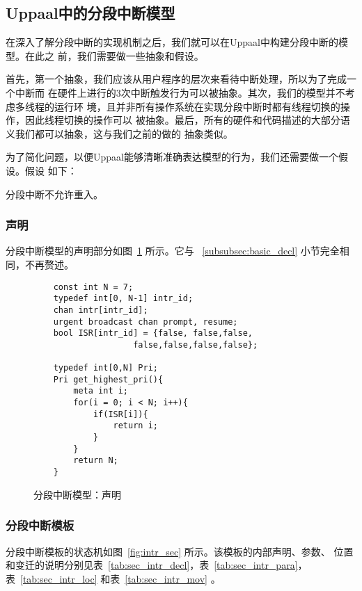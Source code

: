 \subsection{Uppaal中的分段中断模型}
\label{subsec:segment_uppaal}

在深入了解分段中断的实现机制之后，我们就可以在Uppaal中构建分段中断的模型。在此之
前，我们需要做一些抽象和假设。

首先，第一个抽象，我们应该从用户程序的层次来看待中断处理，所以为了完成一个中断而
在硬件上进行的3次中断触发行为可以被抽象。其次，我们的模型并不考虑多线程的运行环
境，且并非所有操作系统在实现分段中断时都有线程切换的操作，因此线程切换的操作可以
被抽象。最后，所有的硬件和代码描述的大部分语义我们都可以抽象，这与我们之前的做的
抽象类似。

为了简化问题，以便Uppaal能够清晰准确表达模型的行为，我们还需要做一个假设。假设
如下：

\begin{assumption}
	分段中断不允许重入。
\end{assumption}

\subsubsection{声明}
\label{subsubsec:segment_decl}

分段中断模型的声明部分如图~\ref{fig:sec_decl} 所示。它与
~\ref{subsubsec:basic_decl} 小节完全相同，不再赘述。

\begin{figure}[H]
	\centering
	\begin{lstlisting}
	const int N = 7;
	typedef int[0, N-1] intr_id; 
	chan intr[intr_id];
	urgent broadcast chan prompt, resume;
	bool ISR[intr_id] = {false, false,false,
					false,false,false,false};
	
	typedef int[0,N] Pri;
	Pri get_highest_pri(){
		meta int i;
		for(i = 0; i < N; i++){
			if(ISR[i]){
				return i;
			} 
		}
		return N;
	}
	\end{lstlisting}
	\caption{分段中断模型：声明}
	\label{fig:sec_decl}
\end{figure}

\subsubsection{分段中断模板}
\label{subsubsec:segment_intr}

分段中断模板的状态机如图~\ref{fig:intr_sec} 所示。该模板的内部声明、参数、
位置和变迁的说明分别见表~\ref{tab:sec_intr_decl}，表~\ref{tab:sec_intr_para}，
表~\ref{tab:sec_intr_loc} 和表~\ref{tab:sec_intr_mov} 。

